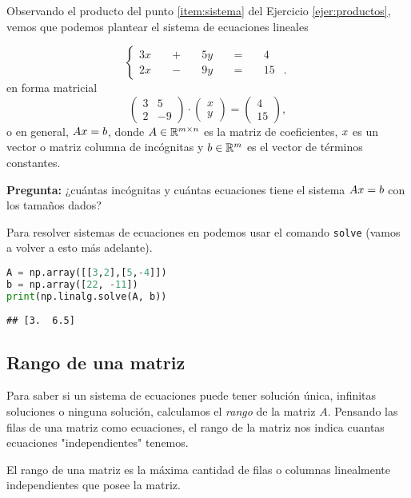 Observando el producto del punto \ref{item:sistema} del Ejercicio \ref{ejer:productos}, vemos que podemos plantear el sistema de ecuaciones lineales

$$
\left\{ {\begin{alignedat}{5}3x&&\;+\;&&5y&&\;=\;&&4&\\2x&&\;-\;&&9y&&\;=\;&&15&.\end{alignedat}} \right.
$$
en forma matricial
$$\begin{pmatrix}3&5\\ 2 & -9 \end{pmatrix} \cdot \begin{pmatrix}x\\ y \end{pmatrix} = \begin{pmatrix}4\\ 15 \end{pmatrix},$$
o en general, $\Ab \xb = \bb$, donde $\Ab \in \mathbb{R}^{m \times n}$ es la matriz de coeficientes, $\xb$ es un vector o matriz columna de incógnitas y $\bb \in \mathbb{R}^{m}$ es el vector de términos constantes.

\textbf{Pregunta:} ¿cuántas incógnitas y cuántas ecuaciones tiene el sistema $\Ab \xb = \bb$ con los tamaños dados?

Para resolver sistemas de ecuaciones en \python podemos usar el comando \texttt{solve} (vamos a volver a esto más adelante).

\begin{Shaded}
\begin{lstlisting}[language=Python]
A = np.array([[3,2],[5,-4]])
b = np.array([22, -11])
print(np.linalg.solve(A, b))
\end{lstlisting}
\end{Shaded}

\begin{verbatim}
## [3.  6.5]
\end{verbatim}

\subsection{Rango de una matriz}

Para saber si un sistema de ecuaciones puede tener solución única, infinitas soluciones o ninguna solución, calculamos el \emph{rango} de la matriz $A$. Pensando las filas de una matriz como ecuaciones, el rango de la matriz nos indica cuantas ecuaciones "independientes" tenemos.

El rango de una matriz es la máxima cantidad de filas o columnas linealmente independientes que posee la matriz.

